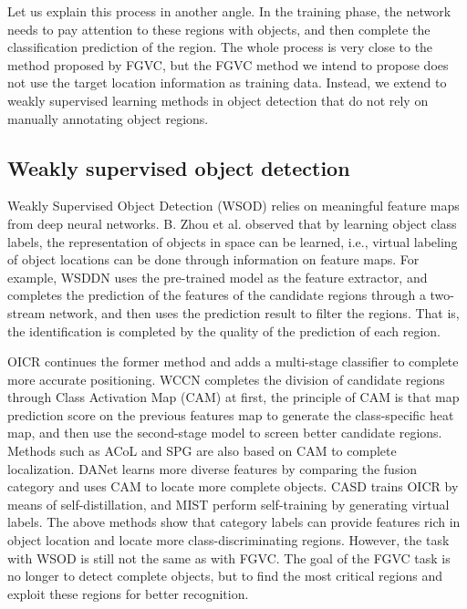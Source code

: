 \documentclass[conference]{IEEEtran}
\begin{document}
Let us explain this process in another angle. In the training phase, the network needs to pay attention to these regions with objects, and then complete the classification prediction of the region. The whole process is very close to the method proposed by FGVC, but the FGVC method we intend to propose does not use the target location information as training data. Instead, we extend to weakly supervised learning methods in object detection that do not rely on manually annotating object regions.

\subsection{Weakly supervised object detection}\label{AA}
Weakly Supervised Object Detection (WSOD) relies on meaningful feature maps from deep neural networks. B. Zhou et al.\cite{scenecnn_iclr15} observed that by learning object class labels, the representation of objects in space can be learned, i.e., virtual labeling of object locations can be done through information on feature maps. For example, WSDDN\cite{WSDDN} uses the pre-trained model as the feature extractor, and completes the prediction of the features of the candidate regions through a two-stream network, and then uses the prediction result to filter the regions. That is, the identification is completed by the quality of the prediction of each region.

OICR\cite{OICR} continues the former method and adds a multi-stage classifier to complete more accurate positioning. WCCN\cite{WCCN} completes the division of candidate regions through Class Activation Map (CAM)\cite{CAM} at first, the principle of CAM is that map prediction score on the previous features map to generate the class-specific heat map, and then use the second-stage model to screen better candidate regions. Methods such as ACoL\cite{ACoL} and SPG\cite{SPG} are also based on CAM to complete localization. DANet\cite{DA_Net} learns more diverse features by comparing the fusion category and uses CAM to locate more complete objects. CASD\cite{CASD} trains OICR\cite{OICR} by means of self-distillation, and MIST\cite{MIST} perform self-training by generating virtual labels. The above methods show that category labels can provide features rich in object location and locate more class-discriminating regions. However, the task with WSOD is still not the same as with FGVC. The goal of the FGVC task is no longer to detect complete objects, but to find the most critical regions and exploit these regions for better recognition. 
\end{document}
